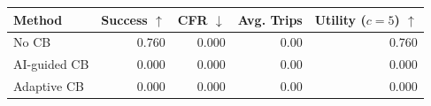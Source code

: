 \begin{tabular}{lrrrr}
\toprule
Method & Success $\uparrow$ & CFR $\downarrow$ & Avg. Trips & Utility ($c=5$) $\uparrow$ \\
\midrule
No CB & 0.760 & 0.000 & 0.00 & 0.760 \\
AI-guided CB & 0.000 & 0.000 & 0.00 & 0.000 \\
Adaptive CB & 0.000 & 0.000 & 0.00 & 0.000 \\
\bottomrule
\end{tabular}
